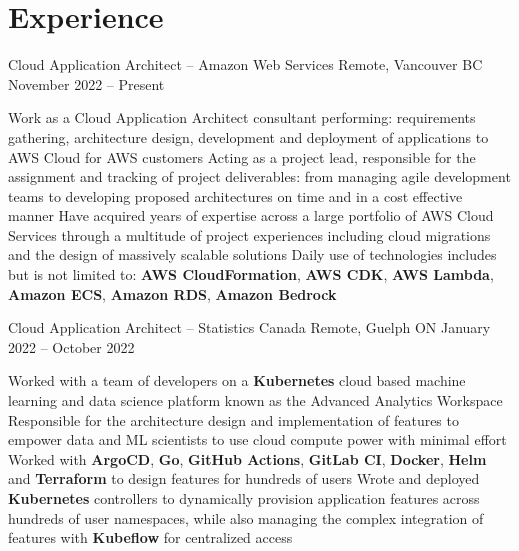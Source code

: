 \documentclass[a4paper,11pt]{article}
\begin{document}
\sectionsep
\section{Experience}
\begin{subheading}

	\resumeExp
	{Cloud Application Architect -- Amazon Web Services}
	{Remote, Vancouver BC}
	{November 2022 -- Present}
	{}
	\begin{entries}
        \ib Work as a Cloud Application Architect consultant performing: requirements gathering, architecture
        design, development and deployment of applications to AWS Cloud for AWS customers
        \ib Acting as a project lead, responsible for the assignment and tracking
        of project deliverables: from managing agile development teams to developing
        proposed architectures on time and in a cost effective manner
        \ib Have acquired years of expertise across a large portfolio of AWS Cloud Services
        through a multitude of project experiences including cloud migrations and the design
        of massively scalable solutions
        \ib Daily use of technologies includes but is not limited to: \textbf{AWS CloudFormation}, 
        \textbf{AWS CDK}, \textbf{AWS Lambda}, \textbf{Amazon ECS}, \textbf{Amazon RDS}, \textbf{Amazon Bedrock}
    \end{entries}

	\resumeExp
	{Cloud Application Architect -- Statistics Canada}
	{Remote, Guelph ON}
	{January 2022 -- October 2022}
	{}
	\begin{entries}
		\ib Worked with a team of developers on a \textbf{Kubernetes} cloud based machine learning and data science
		platform known as the Advanced Analytics Workspace
		\href{https://analytics-platform.statcan.gc.ca/covid19}{\footnotesize{\faExternalLink}}
		\ib Responsible for the architecture design and implementation of features to empower data and ML scientists to
		use cloud compute power with minimal effort
		\ib Worked with \textbf{ArgoCD}, \textbf{Go}, \textbf{GitHub Actions}, \textbf{GitLab CI}, \textbf{Docker}, \textbf{Helm} and
		\textbf{Terraform} to design features for hundreds of users
		\ib Wrote and deployed \textbf{Kubernetes} controllers to dynamically provision application
		features across hundreds of user namespaces, while
		also managing the complex integration of features with \textbf{Kubeflow} for centralized access
	\end{entries}


\end{subheading}
\end{document}
